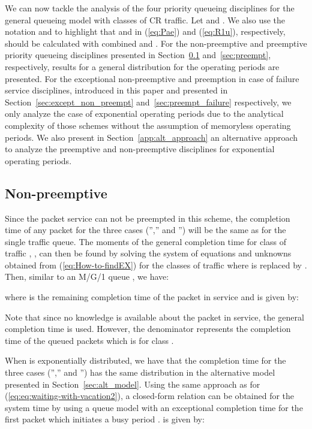 \documentclass[11pt,journal,oneside,onecolumn,draftclsnofoot]{IEEEtran}
\begin{document}
We can now tackle the analysis of the four priority queueing disciplines for the general queueing model with  classes of CR traffic. Let  and .
We also use the notation  and  to highlight that  and  in (\ref{eq:Pae}) and (\ref{eq:R1u}), respectively, should be calculated with combined  and . 
For the non-preemptive and preemptive priority queueing disciplines presented in Section~\ref{sec:non_preempt} and~\ref{sec:preempt}, respectively, results for a general distribution for the operating periods are presented. For the exceptional non-preemptive and preemption in case of failure service disciplines, introduced in this paper and presented in Section~\ref{sec:except_non_preempt} and~\ref{sec:preempt_failure} respectively, we only analyze the case of exponential operating periods due to the analytical complexity of those schemes without the assumption of memoryless operating periods. We also present in Section~\ref{app:alt_approach} an alternative approach to analyze the preemptive and non-preemptive disciplines for exponential operating periods.

\subsection{{Non-preemptive}}
\label{sec:non_preempt}

Since the packet service can not be preempted in this scheme, the completion time of any packet for the three cases ('','' and '') will be the same as for the single traffic queue. The moments of the general completion time  for class of traffic , , can then be found by solving the system of  equations and  unknowns obtained from (\ref{eq:How-to-findEX}) for the  classes of traffic where  is replaced by .
Then, similar to an M/G/1 queue \cite{bertsekas92}, we have: 

where  is the remaining completion time of the packet in service and is given by:

Note that since no knowledge is available about the packet in service, the general completion time is used. However, the denominator represents the completion time of the queued packets which is  for class . 

When  is exponentially distributed, we have that the completion time for the three cases ('','' and '') has the same distribution in the alternative model presented in Section~\ref{sec:alt_model}. Using the same approach as for (\ref{eq:eq:waiting-with-vacation2}), a closed-form relation can be obtained for the system time
by using a queue model with an exceptional completion time  for the first packet which initiates a busy period \cite{takagi91}.  is given by:
\end{document}
